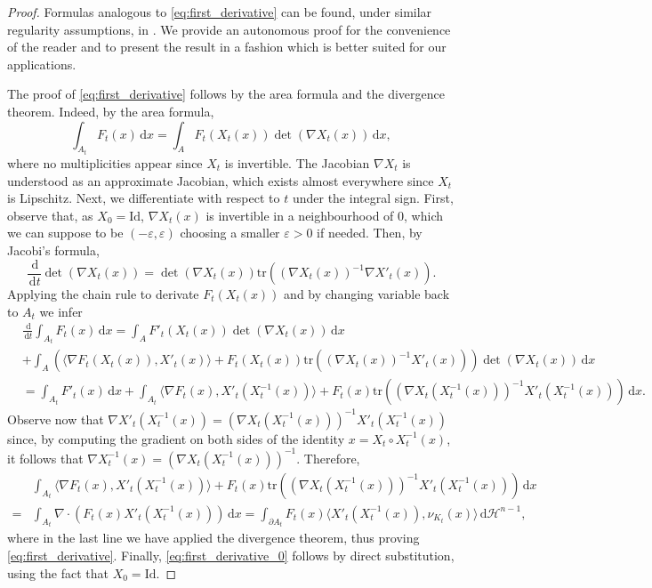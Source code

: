 \documentclass[a4paper, 11pt]{article}
\newcommand{\haus}{\mathcal{H}}
\newcommand{\tra}{\mathrm{tr}}
\newcommand{\Id}{\mathrm{Id}}
\theoremstyle{definition}
\newcommand{\di}{\, \mathrm{d}}
\begin{document}
\begin{proof}
    Formulas analogous to \eqref{eq:first_derivative} can be found, under similar regularity assumptions, in \cite[Section 5]{Henrot_Shape}. We provide an autonomous proof for the convenience of the reader and to present the result in a fashion which is better suited for our applications.

    The proof of \eqref{eq:first_derivative} follows by the area formula \cite[Theorem 3.2.3]{The_Bible} and the divergence theorem. Indeed, by the area formula, \[ \int_{A_t} F_t(x) \di x = \int_{A} F_t(X_t(x))\det(\nabla X_t(x)) \di x,\] where no multiplicities appear since $X_t$ is invertible. The Jacobian $\nabla X_t$ is understood as an approximate Jacobian, which exists almost everywhere since $X_t$ is Lipschitz. Next, we differentiate with respect to $t$ under the integral sign. First, observe that, as $X_0=\Id$, $\nabla X_t(x)$ is invertible in a neighbourhood of $0$, which we can suppose to be $(-\varepsilon,\varepsilon)$ choosing a smaller $\varepsilon>0$ if needed. Then, by Jacobi's formula, \[ \frac{\di}{\di t}\det(\nabla X_t(x)) = \det(\nabla X_t(x)) \tra \left( (\nabla X_t (x))^{-1} \nabla X'_t(x)\right).\] Applying the chain rule to derivate $F_t(X_t(x))$ and by changing variable back to $A_t$ we infer 
    \begin{align*}
        & \frac{\di}{\di t} \int_{A_t} F_t(x) \di x  =  \int_A F'_t(X_t(x))\det(\nabla X_t (x)) \di x \\&+\int_A \left(\langle \nabla F_t(X_t(x)), X'_t(x)\rangle + F_t(X_t(x)) \tra \left( (\nabla X_t (x))^{-1} X'_t(x)\right) \right)\det(\nabla X_t (x)) \di x\\
        & = \int_{A_t} F'_t(x) \di x +\int_{A_t} \langle \nabla F_t(x), X'_t(X^{-1}_t(x))\rangle + F_t(x) \tra \left( (\nabla X_t (X^{-1}_t(x)))^{-1} X'_t(X^{-1}_t(x))\right) \di x.
    \end{align*}
    Observe now that $\nabla  X'_t(X^{-1}_t(x))=(\nabla X_t (X^{-1}_t(x)))^{-1} X'_t(X^{-1}_t(x))$ since, by computing the gradient on both sides of the identity $x=X_t \circ X^{-1}_t(x)$, it follows that $\nabla X^{-1}_t(x)=\left( \nabla X_t(X^{-1}_t (x))\right)^{-1}$. Therefore, 
    \begin{align*}
        & \int_{A_t} \langle \nabla F_t(x), X'_t(X^{-1}_t(x))\rangle + F_t(x) \tra \left( (\nabla X_t (X^{-1}_t(x)))^{-1} X'_t(X^{-1}_t(x))\right) \di x\\
        =& \int_{A_t} \nabla \cdot \left( F_t(x) X'_t(X^{-1}_t(x))\right) \di x = \int_{\partial A_t} F_t(x) \langle X'_t(X^{-1}_t(x)),\nu_{K_t}(x) \rangle \di \haus^{n-1},
    \end{align*}
    where in the last line we have applied the divergence theorem, thus proving \eqref{eq:first_derivative}. Finally, \eqref{eq:first_derivative_0} follows by direct substitution, using the fact that $X_0=\Id$.
\end{proof}
\end{document}
